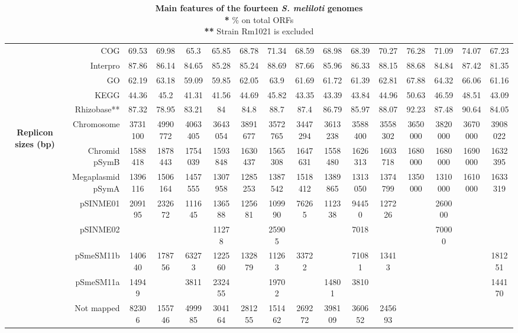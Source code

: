 \begin{table}
\begin{tabular}{rrcccccccccccccc@{}}
    \multicolumn{1}{c}{} & COG   & 69.53 & 69.98 & 65.3  & 65.85 & 68.78 & 71.34 & 68.59 & 68.98 & 68.39 & 70.27 & 76.28 & 71.09 & 74.07 & 67.23 \\
    \multicolumn{1}{c}{} & Interpro & 87.86 & 86.14 & 84.65 & 85.28 & 85.24 & 88.69 & 87.66 & 85.96 & 86.33 & 88.15 & 88.68 & 84.84 & 87.42 & 81.35 \\
    \multicolumn{1}{c}{} & GO    & 62.19 & 63.18 & 59.09 & 59.85 & 62.05 & 63.9  & 61.69 & 61.72 & 61.39 & 62.81 & 67.88 & 64.32 & 66.06 & 61.16 \\
    \multicolumn{1}{c}{} & KEGG  & 44.36 & 45.2  & 41.31 & 41.56 & 44.69 & 45.82 & 43.35 & 43.39 & 43.84 & 44.96 & 50.63 & 46.59 & 48.51 & 43.09 \\
    \multicolumn{1}{c}{} & Rhizobase** & 87.32 & 78.95 & 83.21 & 84    & 84.8  & 88.7  & 87.4  & 86.79 & 85.97 & 88.07 & 92.23 & 87.48 & 90.64 & 84.05 \\
    \multicolumn{1}{c}{\multirow{8}[0]{*}{\begin{sideways}\textbf{Replicon sizes (bp)}\end{sideways}}} & Chromosome & 3731100 & 4990772 & 4063405 & 3643054 & 3891677 & 3572765 & 3447294 & 3613238 & 3588400 & 3558302 & 3650000 & 3820000 & 3670000 & 3908022 \\
    \multicolumn{1}{c}{} & Chromid pSymB & 1588418 & 1878443 & 1754039 & 1593848 & 1630437 & 1565308 & 1647631 & 1558480 & 1626313 & 1603718 & 1680000 & 1680000 & 1690000 & 1632395 \\
    \multicolumn{1}{c}{} & Megaplasmid pSymA & 1396116 & 1506164 & 1457555 & 1307958 & 1285253 & 1387542 & 1518412 & 1389865 & 1313050 & 1374799 & 1350000 & 1310000 & 1610000 & 1633319 \\
    \multicolumn{1}{c}{} & pSINME01 & 209195 & 232672 & 111645 & 136588 & 125681 & 109990 & 76265 & 112338 & 94450 & 127226 &       & 260000 &       &  \\
    \multicolumn{1}{c}{} & pSINME02 &       &       &       & 11278 &       & 25905 &       &       & 7018  &       &       & 70000 &       &  \\
    \multicolumn{1}{c}{} & pSmeSM11b & 140640 & 178756 & 63273 & 122560 & 132879 & 11263 & 33722 &       & 71081 & 13413 &       &       &       & 181251 \\
    \multicolumn{1}{c}{} & pSmeSM11a & 14949 &       & 3811  & 232455 &       & 19702 &       & 14801 & 3810  &       &       &       &       & 144170 \\
    \multicolumn{1}{c}{} & Not mapped & 82306 & 155746 & 499985 & 304164 & 281255 & 151462 & 269272 & 398109 & 360652 & 245693 &       &       &       &  \\
    \bottomrule
    \end{tabular}%
  \caption{\textbf{Main features of the fourteen \textit{S. meliloti} genomes}\\
  			\textbf{*} \% on total ORFs\\
  			\textbf{**} Strain Rm1021 is excluded}
  \label{tab:genomestats}%
\end{table}%

